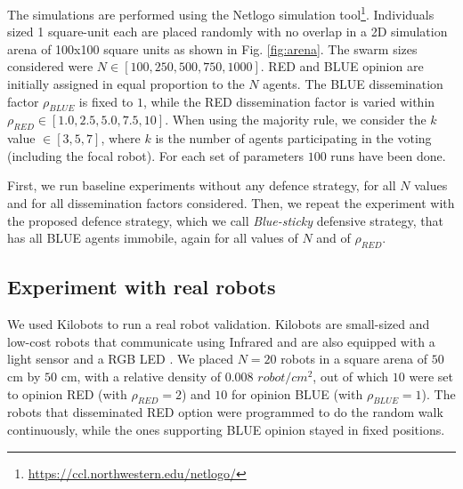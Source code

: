 \documentclass[sigconf]{acmart}
\begin{document}
  
The simulations are performed using the Netlogo simulation tool\footnote{\url{https://ccl.northwestern.edu/netlogo/}}. 
Individuals sized 1 square-unit each are placed randomly with no overlap in a 2D simulation arena of 100x100 square units as shown in Fig. \ref{fig:arena}. The swarm sizes considered were $N \in [100, 250, 500, 750, 1000]$. 
RED and BLUE opinion are initially assigned in equal proportion to the $N$ agents. 
The BLUE dissemination factor $\rho_{BLUE}$ is fixed to $1$, while the RED  dissemination factor is varied within $\rho_{RED} \in [1.0, 2.5, 5.0, 7.5, 10]$. When using the majority rule, we consider the $k$ value $\in [3, 5, 7]$, where $k$ is the number of agents participating in the voting (including the focal robot). For each set of parameters $100$ runs have been done. 

First, we run baseline experiments without any defence strategy, for all $N$ values and for all dissemination factors considered. %
Then,  we repeat the experiment with the proposed defence strategy, which we call \emph{Blue-sticky} defensive strategy, that has all BLUE agents  immobile, again for all values of $N$ and of $\rho_{RED}$.

\subsection{Experiment with real robots}

We used Kilobots to run a real robot validation. Kilobots are small-sized and low-cost robots that communicate using Infrared and are also equipped  with a light sensor and a RGB LED \cite{Rubenstein2012kilobot}. We placed $N= 20$ robots in a square arena of $50$ cm by $50$ cm, with a relative density of $0.008$ $robot/cm^2$, out of which $10$ were set to opinion RED (with $\rho_{RED}=2$) and $10$ for opinion BLUE (with $\rho_{BLUE}=1$). The robots that disseminated RED option  were programmed to do the random walk continuously, while the ones supporting BLUE opinion stayed in fixed positions. 
\end{document}
